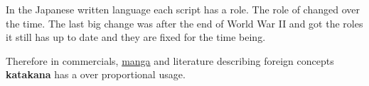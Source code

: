 
\label{sec:role}

In the Japanese written language each script has a role. The role of
\textbf{\jtopic} changed over the time. The last big change was after the end
of World War II and \textbf{\jtopic} got the roles it still has up to date and
they are fixed for the time being.

\bigskip



\medskip


Therefore in commercials, \hyperref[sec:Manga]{manga} and literature describing
foreign concepts \textbf{katakana} has a over proportional usage.

%

%

